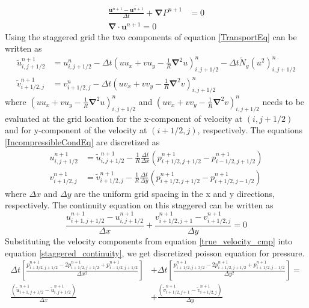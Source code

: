 \documentclass[12pt]{report}   %
\newcommand{\bu}{\mathbf{u}}
\newcommand{\grad}{\mathbf{\nabla}}
\newcommand{\Ndg}{\tilde{N}_g}
\begin{document}
\begin{equation}
\begin{split}
 \frac{\bu^{n+1}-\tilde{\bu^{n+1}}}{\Delta t} +\grad P^{n+1} &= 0\\
 \grad \cdot \bu^{n+1} = 0
 \label{IncompressibleCondEq}
 \end{split}
\end{equation}
Using the staggered grid the two components of equation \eqref{TransportEq} can be written as
\begin{equation}
\begin{split}
 \tilde{u}_{i,j+1/2}^{n+1} &= u_{i,j+1/2}^n - \Delta t \left(u u_x + vu_y -\frac{1}{R}\grad^2u \right)_{i,j+1/2}^n -\Delta t\Ndg (u^2)_{i,j+1/2}^n\\
 \tilde{v}_{i+1/2,j}^{n+1} &= v_{i+1/2,j}^n - \Delta t \left(u v_x + vv_y -\frac{1}{R}\grad^2v \right)_{i,j+1/2}^n
\end{split}
\end{equation}
where $\left(u u_x + vu_y -\frac{1}{R}\grad^2u \right)_{i,j+1/2}^n$ and $\left(u v_x + vv_y -\frac{1}{R}\grad^2v \right)_{i,j+1/2}^n$
needs to be evaluated at the grid location for the x-component of velocity at $(i,j+1/2)$ and for y-component of the velocity at $(i+1/2,j)$, respectively. The equations \eqref{IncompressibleCondEq} are discretized as 
\begin{equation}
\begin{split}
 u^{n+1}_{i,j+1/2} &= \tilde{u}^{n+1}_{i,j+1/2} -\frac{1}{R} \frac{\Delta t}{\Delta x} \left(p_{i+1/2,j+1/2}^{n+1} -p_{i-1/2,j+1/2}^{n+1} \right)\\
 v^{n+1}_{i+1/2,j} &= \tilde{v}^{n+1}_{i+1/2,j} -\frac{1}{R} \frac{\Delta t}{\Delta y} \left(p_{i+1/2,j+1/2}^{n+1} -p_{i+1/2,j-1/2}^{n+1} \right)
 \end{split}
 \label{true_velocity_cmp}
\end{equation}
where $\Delta x$ and $\Delta y$ are the uniform grid spacing in the x and y directions, respectively. The continuity equation on this staggered can be written as 
\begin{equation}
 \frac{ u_{i+1,j+1/2}^{n+1}-u_{i,j+1/2}^{n+1} }{ \Delta x } +\frac{v_{i+1/2,j+1}^{n+1}-v_{i+1/2,j}^{n+1} }{\Delta y} = 0
 \label{staggered_continuity}
 \end{equation}
Substituting the velocity components from equation \eqref{true_velocity_cmp} into equation \eqref{staggered_continuity}, we get discretized poisson equation for pressure.
\begin{equation}
\begin{split}
  \Delta t \left[\frac{p_{i+3/2,j+1/2}^{n+1}-2p_{i+1/2,j+1/2}^{n+1}+p_{i-1/2,j+1/2}^{n+1}}{\Delta x^2} \right] &+
 \Delta t \left[ \frac{p_{i+1/2,j+3/2}^{n+1}-2p_{i+1/2,j+1/2}^{n+1}+p_{i+1/2,j-1/2}^{n+1}}{\Delta y^2}   \right] = \\
 \frac{\left(\tilde{u}_{i+1,j+1/2}^{n+1}-
  \tilde{u}_{i,j+1/2}^{n+1}  \right) }{\Delta x}&+\frac{\left(\tilde{v}_{i+1/2,j+1}^{n+1}-\tilde{v}_{i+1/2,j}^{n+1}  \right)}{\Delta y}
\end{split}
\label{pressure_equation}
\end{equation}
\end{document}
